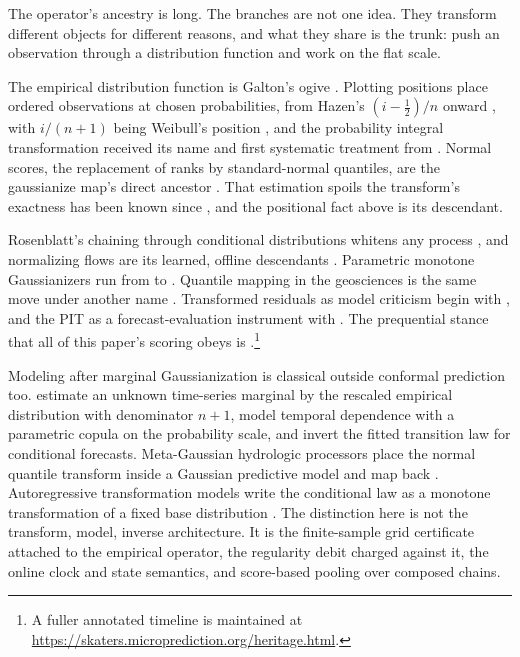 \documentclass[11pt]{article}
\theoremstyle{remark}
\begin{document}
The operator's ancestry is long. The
branches are not one idea. They transform different objects for different reasons, and
what they share is the trunk: push an observation through a distribution function and
work on the flat scale.

The
empirical distribution function is Galton's ogive \citep{galton1875}. Plotting positions
place ordered observations at chosen probabilities, from Hazen's $(i - \tfrac12)/n$
onward \citep{hazen1914}, with $i/(n+1)$ being Weibull's position
\citep{weibull1939}, and
the probability integral transformation received its name and first systematic treatment
from \citet{pearson1938}. Normal scores, the replacement of ranks by standard-normal
quantiles, are the gaussianize map's direct ancestor \citep{vanderwaerden1952}. That
estimation spoils the transform's exactness has been known since
\citet{davidjohnson1948}, and the positional fact above is its descendant.

Rosenblatt's
chaining through conditional distributions whitens any process
\citep{rosenblatt1952remarks}, and normalizing flows are its learned, offline
descendants \citep{tabak2010,papamakarios2021normalizing}. Parametric monotone
Gaussianizers run from \citet{boxcox1964} to \citet{yeojohnson2000}. Quantile
mapping in the geosciences is the same move under another name
\citep{panofskybrier1968}. Transformed residuals as model criticism begin with
\citet{coxsnell1968}, and the PIT as a forecast-evaluation instrument with
\citet{diebold1998evaluating}. The prequential stance that all of this paper's
scoring obeys is \citet{dawid1984present}.\footnote{A fuller annotated timeline is maintained at
\url{https://skaters.microprediction.org/heritage.html}.}

Modeling after marginal Gaussianization is classical outside conformal prediction
too. \citet{chenfan2006} estimate an unknown time-series marginal by the rescaled
empirical distribution with denominator $n + 1$, model temporal dependence with a
parametric copula on the probability scale, and invert the fitted transition law for
conditional forecasts. Meta-Gaussian hydrologic processors place the normal quantile
transform inside a Gaussian predictive model and map back \citep{bogner2012normal}.
Autoregressive transformation models write the conditional law as a monotone
transformation of a fixed base distribution \citep{rugamer2023autoregressive}. The
distinction here is not the transform, model, inverse architecture. It is the
finite-sample grid certificate attached to the empirical operator, the regularity
debit charged against it, the online clock and state semantics, and score-based
pooling over composed chains.
\end{document}
